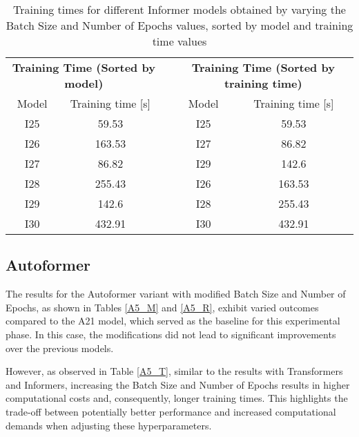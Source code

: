 \begin{table}[]
    \begin{tabular}{ccccc}
    \multicolumn{2}{c}{\textbf{Training   Time (Sorted by model)}} &  & \multicolumn{2}{c}{\textbf{Training Time (Sorted   by training time)}} \\
    Model             & Training time {[}s{]}                      &  & Model                 & Training time {[}s{]}                          \\
    I25               & \cellcolor[HTML]{63BE7B}59.53              &  & I25                   & \cellcolor[HTML]{63BE7B}59.53                  \\
    I26               & \cellcolor[HTML]{FFE784}163.53             &  & I27                   & \cellcolor[HTML]{90CB7D}86.82                  \\
    I27               & \cellcolor[HTML]{90CB7D}86.82              &  & I29                   & \cellcolor[HTML]{EDE582}142.6                  \\
    I28               & \cellcolor[HTML]{FDBC7B}255.43             &  & I26                   & \cellcolor[HTML]{FFE784}163.53                 \\
    I29               & \cellcolor[HTML]{EDE582}142.6              &  & I28                   & \cellcolor[HTML]{FDBC7B}255.43                 \\
    I30               & \cellcolor[HTML]{F8696B}432.91             &  & I30                   & \cellcolor[HTML]{F8696B}432.91                
    \end{tabular}
    \caption{Training times for different Informer models obtained by varying the Batch Size and Number of Epochs values, sorted by model and training time values}
    \label{I5_T}
    \end{table}

\subsection{Autoformer}
The results for the Autoformer variant with modified Batch Size and Number of Epochs, as shown in Tables \ref{A5_M} and \ref{A5_R}, exhibit varied outcomes compared to the A21 model, which served as the baseline for this experimental phase. In this case, the modifications did not lead to significant improvements over the previous models.

However, as observed in Table \ref{A5_T}, similar to the results with Transformers and Informers, increasing the Batch Size and Number of Epochs results in higher computational costs and, consequently, longer training times. This highlights the trade-off between potentially better performance and increased computational demands when adjusting these hyperparameters.
    


